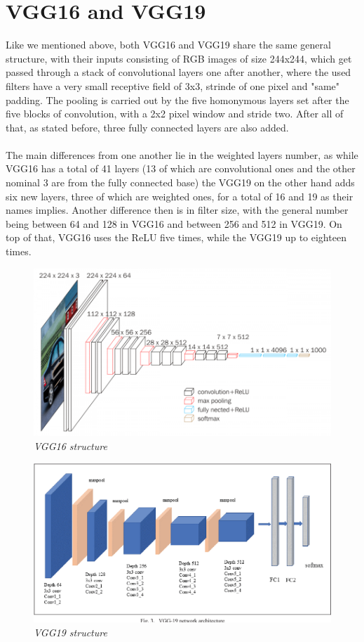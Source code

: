 \documentclass[12pt,a4paper]{report}
\begin{document}
\section{VGG16 and VGG19}
Like we mentioned above, both VGG16 and VGG19 share the same general structure, with their inputs consisting of RGB images of size 244x244, which get passed through a stack of convolutional layers one after another, where the used filters have a very small receptive field of 3x3, strinde of one pixel and "same" padding. The pooling is carried out by the five homonymous layers set after the five blocks of convolution, with a 2x2 pixel window and stride two. After all of that, as stated before, three fully connected layers are also added. \\ \\
The main differences from one another lie in the  weighted layers number, as while VGG16 has a total of 41 layers (13 of which are convolutional ones and the other nominal 3 are from the fully connected base) the VGG19 on the other hand adds six new layers, three of which are weighted ones, for a total of 16 and 19 as their names implies. Another difference then is in filter size, with the general number being between 64 and 128 in VGG16 and between 256 and 512 in VGG19. On top of that, VGG16 uses the ReLU five times, while the VGG19 up to eighteen times.
\begin{figure}[H]
\centering
\includegraphics[scale=0.3]{./immagini/vgg16_structure.png}
\caption{\textit{VGG16 structure \cite{VGG16_image}}}
\label{fig:vgg16_structure}
\end{figure}
\begin{figure}[H]
\centering
\includegraphics[scale=0.3]{./immagini/vgg19_structure.png}
\caption{\textit{VGG19 structure \cite{VGG19_image}}}
\label{fig:vgg19_structure}
\end{figure}
\end{document}
